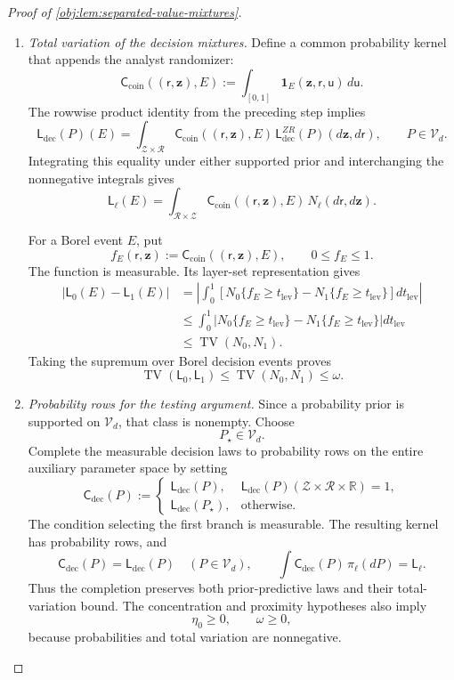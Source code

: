 \begin{proof}[Proof of \cref{obj:lem:separated-value-mixtures}]
\begin{enumerate}
\item \textit{Total variation of the decision mixtures.}
Define a common probability kernel that appends the analyst randomizer:
\[
\mathsf C_{\mathrm{coin}}((\mathsf r,\mathbf z),E)
:=
\int_{[0,1]}
\mathbf1_E(\mathbf z,\mathsf r,\mathsf u)\,d\mathsf u.
\]
The rowwise product identity from the preceding step implies
\[
\mathsf L_{\mathrm{dec}}(P)(E)
=
\int_{\mathcal Z\times\mathcal R}
\mathsf C_{\mathrm{coin}}((\mathsf r,\mathbf z),E)\,
\mathsf L_{\mathrm{dec}}^{ZR}(P)(d\mathbf z,d\mathsf r),
\qquad P\in\mathcal V_d.
\]
Integrating this equality under either supported prior and interchanging the nonnegative integrals gives
\[
\mathsf L_\ell(E)
=
\int_{\mathcal R\times\mathcal Z}
\mathsf C_{\mathrm{coin}}((\mathsf r,\mathbf z),E)\,
N_\ell(d\mathsf r,d\mathbf z).
\]

For a Borel event \(E\), put
\[
f_E(\mathsf r,\mathbf z)
:=
\mathsf C_{\mathrm{coin}}((\mathsf r,\mathbf z),E),
\qquad
0\le f_E\le1.
\]
The function is measurable. Its layer-set representation gives
\[
\begin{aligned}
|\mathsf L_0(E)-\mathsf L_1(E)|
&=
\left|
\int_0^1
\left[
N_0\{f_E\ge t_{\mathrm{lev}}\}
-
N_1\{f_E\ge t_{\mathrm{lev}}\}
\right]dt_{\mathrm{lev}}
\right|\\
&\le
\int_0^1
\left|
N_0\{f_E\ge t_{\mathrm{lev}}\}
-
N_1\{f_E\ge t_{\mathrm{lev}}\}
\right|dt_{\mathrm{lev}}\\
&\le \operatorname{TV}(N_0,N_1).
\end{aligned}
\]
Taking the supremum over Borel decision events proves
\[
\operatorname{TV}(\mathsf L_0,\mathsf L_1)
\le \operatorname{TV}(N_0,N_1)
\le\omega.
\]

\item \textit{Probability rows for the testing argument.}
Since a probability prior is supported on \(\mathcal V_d\), that class is nonempty. Choose
\[
P_\star\in\mathcal V_d.
\]
Complete the measurable decision laws to probability rows on the entire auxiliary parameter space by setting
\[
\mathsf C_{\mathrm{dec}}(P):=
\begin{cases}
\mathsf L_{\mathrm{dec}}(P),
&\mathsf L_{\mathrm{dec}}(P)
(\mathcal Z\times\mathcal R\times\mathbb R)=1,\\
\mathsf L_{\mathrm{dec}}(P_\star),
&\text{otherwise}.
\end{cases}
\]
The condition selecting the first branch is measurable. The resulting kernel has probability rows, and
\[
\mathsf C_{\mathrm{dec}}(P)
=\mathsf L_{\mathrm{dec}}(P)
\quad(P\in\mathcal V_d),
\qquad
\int\mathsf C_{\mathrm{dec}}(P)\,\pi_\ell(dP)
=\mathsf L_\ell.
\]
Thus the completion preserves both prior-predictive laws and their total-variation bound. The concentration and proximity hypotheses also imply
\[
\eta_0\ge0,
\qquad
\omega\ge0,
\]
because probabilities and total variation are nonnegative.


\end{enumerate}
\end{proof}
